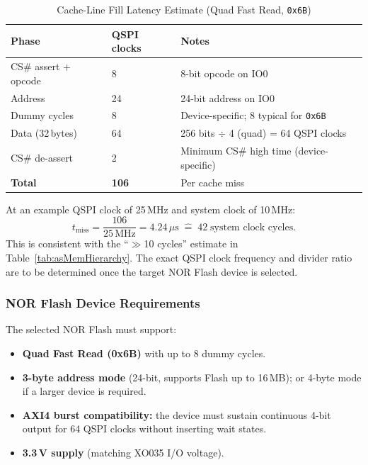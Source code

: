 \begin{table}[H]
\caption{Cache-Line Fill Latency Estimate (Quad Fast Read, \texttt{0x6B})}
\label{tab:asQspiLat}
\centering
\begin{tabularx}{\textwidth}{|l |l |X|}
  \hline
  Phase & QSPI clocks & Notes \\
  \hline
  \hline
  CS\# assert + opcode  &  8 & 8-bit opcode on IO0 \\
  \hline
  Address               & 24 & 24-bit address on IO0 \\
  \hline
  Dummy cycles          &  8 & Device-specific; 8 typical for \texttt{0x6B} \\
  \hline
  Data (32\,bytes)      & 64 & 256 bits $\div$ 4 (quad) = 64 QSPI clocks \\
  \hline
  CS\# de-assert        &  2 & Minimum CS\# high time (device-specific) \\
  \hline
  \textbf{Total}        & \textbf{106} & Per cache miss \\
  \hline
\end{tabularx}
\end{table}

At an example QSPI clock of 25\,MHz and system clock of 10\,MHz:
\[
  t_\text{miss} = \frac{106}{25\,\text{MHz}} = 4.24\,\mu\text{s}
  \;\widehat{=}\; 42\;\text{system clock cycles}.
\]
This is consistent with the ``$\gg$10 cycles'' estimate in
Table~\ref{tab:asMemHierarchy}.
The exact QSPI clock frequency and divider ratio are to be determined
once the target NOR Flash device is selected.

\subsubsection{NOR Flash Device Requirements}

The selected NOR Flash must support:

\begin{itemize}
  \item \textbf{Quad Fast Read (0x6B)} with up to 8 dummy cycles.
  \item \textbf{3-byte address mode} (24-bit, supports Flash up to 16\,MB);
    or 4-byte mode if a larger device is required.
  \item \textbf{AXI4 burst compatibility:} the device must sustain
    continuous 4-bit output for 64 QSPI clocks without inserting wait
    states.
  \item \textbf{3.3\,V supply} (matching XO035 I/O voltage).
\end{itemize}

